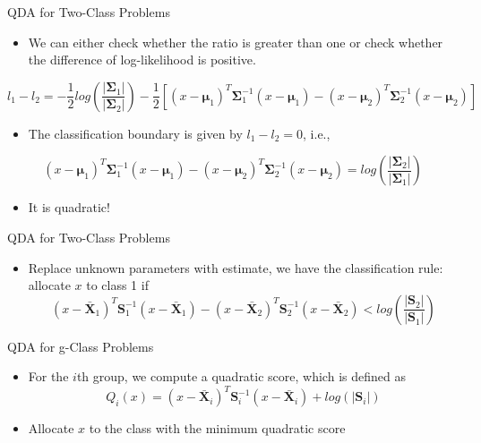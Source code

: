 \documentclass[
  ignorenonframetext,
]{beamer}
\providecommand{\tightlist}{%
  \setlength{\itemsep}{0pt}\setlength{\parskip}{0pt}}
\begin{document}
\begin{frame}{QDA for Two-Class Problems}
\protect\hypertarget{qda-for-two-class-problems-3}{}
\begin{itemize}
\tightlist
\item
  We can either check whether the ratio is greater than one or check
  whether the difference of log-likelihood is positive.
\end{itemize}

\[l_1 - l_2=-\frac{1}{2}log(\frac{|\boldsymbol\Sigma_1|}{|\boldsymbol\Sigma_2|}) - \frac{1}{2} [(x-\boldsymbol \mu_1)^T \boldsymbol \Sigma_1^{-1} (x-\boldsymbol \mu_1) - (x-\boldsymbol \mu_2)^T \boldsymbol \Sigma_2^{-1} (x-\boldsymbol \mu_2)]\]

\begin{itemize}
\tightlist
\item
  The classification boundary is given by \(l_1-l_2=0\), i.e.,
\end{itemize}

\[(x-\boldsymbol \mu_1)^T \boldsymbol \Sigma_1^{-1} (x-\boldsymbol \mu_1) - (x-\boldsymbol \mu_2)^T \boldsymbol \Sigma_2^{-1} (x-\boldsymbol \mu_2) = log(\frac{|\boldsymbol\Sigma_2|}{|\boldsymbol\Sigma_1|})\]

\begin{itemize}
\tightlist
\item
  It is quadratic!
\end{itemize}
\end{frame}

\begin{frame}{QDA for Two-Class Problems}
\protect\hypertarget{qda-for-two-class-problems-4}{}
\begin{itemize}
\tightlist
\item
  Replace unknown parameters with estimate, we have the classification
  rule: allocate \(x\) to class 1 if
  \[(x-\bar {\mathbf X}_1)^T \mathbf S _1^{-1} (x-\bar {\mathbf X}_1) - (x-\bar {\mathbf X}_2)^T \mathbf S_2^{-1} (x-\bar {\mathbf X}_2) < log(\frac{|\mathbf S_2|}{|\mathbf S_1|})\]
\end{itemize}
\end{frame}

\begin{frame}{QDA for g-Class Problems}
\protect\hypertarget{qda-for-g-class-problems}{}
\begin{itemize}
\item
  For the \(i\)th group, we compute a quadratic score, which is defined
  as\\
  \[Q_i(x)=(x-\bar {\mathbf X}_i)^T \mathbf S _i^{-1} (x-\bar {\mathbf X}_i)+ log(|\mathbf S_i|)\]
\item
  Allocate \(x\) to the class with the minimum quadratic score
\end{itemize}
\end{frame}
\end{document}
